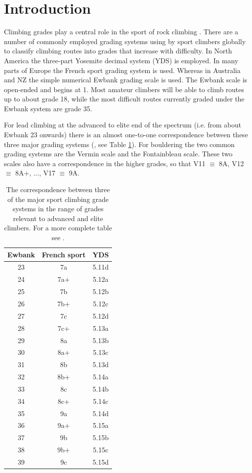 \documentclass{article}
\begin{document}
\section*{Introduction}

Climbing grades play a central role in the sport of rock climbing \cite{delignieres1993psychophysical,draper2015comparative}. There are a number of commonly employed grading systems using by sport climbers globally to classify climbing routes into grades that increase with difficulty. In North America the three-part Yosemite decimal system (YDS) is employed. In many parts of Europe the French sport grading system is used. Whereas in Australia and NZ the simple numerical Ewbank grading scale is used. The Ewbank scale is open-ended and begins at 1. Most amateur climbers will be able to climb routes up to about grade 18, while the most difficult routes currently graded under the Ewbank system are grade 35. 

For lead climbing at the advanced to elite end of the spectrum (i.e. from about Ewbank 23 onwards) there is an almost one-to-one correspondence between these three major grading systems (\cite{draper2015comparative}, see Table \ref{table1}). For bouldering the two common grading systems are the Vermin scale and the Fontainbleau scale. These two scales also have a correspondence in the higher grades, so that V11 $\equiv$ 8A, V12 $\equiv$ 8A+, $\dots$, V17 $\equiv$ 9A.


\begin{table}
\centering
\begin{tabular}{| c | c | c |}
  \hline			
  {\bf Ewbank} & {\bf French sport} & {\bf YDS} \\
  \hline			
  23 & 7a & 5.11d \\
  24 & 7a+ & 5.12a \\
  25 & 7b & 5.12b \\
  26 & 7b+ & 5.12c \\
  27 & 7c & 5.12d \\
  28 & 7c+ & 5.13a \\
  29 & 8a & 5.13b \\
  30 & 8a+ & 5.13c \\
  31 & 8b & 5.13d \\
  32 & 8b+ & 5.14a \\
  33 & 8c & 5.14b \\
  34 & 8c+ & 5.14c \\
  35 & 9a & 5.14d \\
  36 & 9a+ & 5.15a \\
  37 & 9b & 5.15b \\
  38 & 9b+ & 5.15c \\
  39 & 9c & 5.15d \\
  \hline  
\end{tabular}
\caption{The correspondence between three of the major sport climbing grade systems in the range of grades relevant to advanced and elite climbers. For a more complete table see \cite{draper2015comparative}. }
\label{table1}
\end{table}
\end{document}
